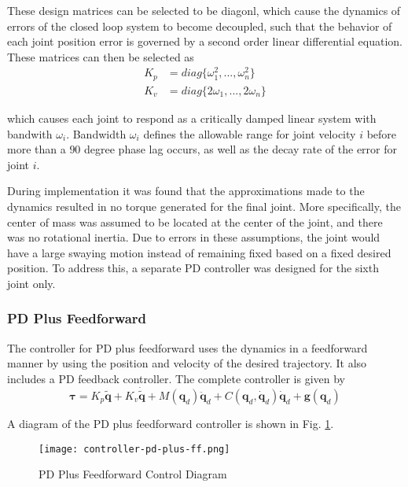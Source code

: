 \documentclass[conference]{IEEEtran}
\begin{document}
These design matrices can be selected to be diagonl, which cause the
dynamics of errors of the closed loop system to become decoupled, such that the
behavior of each joint position error is governed by a second order linear
differential equation. These matrices can then be selected as
\begin{align*}
  K_p &= diag\{\omega_1^2, ... , \omega_n^2\} \\
  K_v &= diag\{2\omega_1, ... , 2\omega_n\}
\end{align*}

which causes each joint to respond as a critically damped linear system with
bandwith $\omega_i$. Bandwidth $\omega_i$ defines the allowable range for joint
velocity $i$ before more than a $90$ degree phase lag occurs, as well as the
decay rate of the error for joint $i$.

During implementation it was found that the approximations made to the dynamics
resulted in no torque generated for the final joint. More specifically, the
center of mass was assumed to be located at the center of the joint, and there
was no rotational inertia. Due to errors in these assumptions, the joint would
have a large swaying motion instead of remaining fixed based on a fixed desired
position. To address this, a separate PD controller was designed for the sixth
joint only.

\subsubsection{PD Plus Feedforward}
The controller for PD plus feedforward uses the dynamics in a feedforward manner
by using the position and velocity of the desired trajectory. It also includes a
PD feedback controller. The complete controller is given by
\begin{equation*}
  \boldsymbol{\tau} = K_p \tilde{\boldsymbol{q}} + K_v \dot{\tilde{\boldsymbol{q}}} + M(\boldsymbol{q}_d)\ddot{\boldsymbol{q}}_d +  C(\boldsymbol{q}_d, \dot{\boldsymbol{q}}_d)\dot{\boldsymbol{q}}_d + \boldsymbol{g}(\boldsymbol{q}_d)
\end{equation*}

A diagram of the PD plus feedforward controller is shown in
Fig. \ref{fig:pd-plus-ff}.

\begin{figure}[!t]
  \texttt{[image: controller-pd-plus-ff.png]}
  \caption{PD Plus Feedforward Control Diagram}
  \label{fig:pd-plus-ff}
\end{figure}
\end{document}
